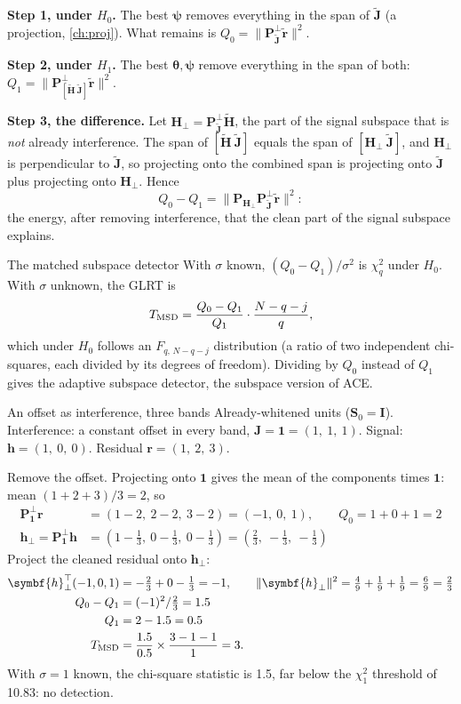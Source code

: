 \documentclass[11pt,a4paper,oneside,openany]{book}
\newcommand{\B}[1]{{\symbf{#1}}}
\newcommand{\B}[1]{{\bm{#1}}}
\newcommand{\T}{^{\top}}
\newcommand{\nrm}[1]{\lVert #1\rVert}
\newcommand{\vr}{\B{r}}
\newcommand{\vh}{\B{h}}
\newcommand{\vone}{\B{1}}
\newcommand{\vtheta}{\B{\theta}}
\newcommand{\vpsi}{\B{\psi}}
\newcommand{\mS}{\B{S}}
\newcommand{\mH}{\B{H}}
\newcommand{\mJ}{\B{J}}
\newcommand{\mP}{\B{P}}
\newcommand{\mI}{\B{I}}
\begin{document}
\textbf{Step 1, under $H_0$.} The best $\vpsi$ removes everything in the span of $\tilde{\mJ}$ (a projection, \cref{ch:proj}). What remains is
$Q_0=\nrm{\mP^\perp_{\tilde{\mJ}}\tilde{\vr}}^2$.

\textbf{Step 2, under $H_1$.} The best $\vtheta,\vpsi$ remove everything in the span of both: $Q_1=\nrm{\mP^\perp_{[\tilde{\mH}\ \tilde{\mJ}]}\tilde{\vr}}^2$.

\textbf{Step 3, the difference.} Let $\mH_\perp=\mP^\perp_{\tilde{\mJ}}\tilde{\mH}$, the part of the signal subspace that is \emph{not} already interference.
The span of $[\tilde{\mH}\ \tilde{\mJ}]$ equals the span of $[\mH_\perp\ \tilde{\mJ}]$, and $\mH_\perp$ is perpendicular to $\tilde{\mJ}$, so projecting onto the
combined span is projecting onto $\tilde{\mJ}$ plus projecting onto $\mH_\perp$. Hence
\[
  Q_0-Q_1=\nrm{\mP_{\mH_\perp}\mP^\perp_{\tilde{\mJ}}\tilde{\vr}}^2 :
\]
the energy, after removing interference, that the clean part of the signal subspace explains.

\begin{rulebox}[label=rule:msd]{The matched subspace detector}
With $\sigma$ known, $(Q_0-Q_1)/\sigma^2$ is $\chi^2_q$ under $H_0$. With $\sigma$ unknown, the GLRT is
\[
  T_{\rm MSD}=\frac{Q_0-Q_1}{Q_1}\cdot\frac{N-q-j}{q},
\]
which under $H_0$ follows an $F_{q,\,N-q-j}$ distribution (a ratio of two independent chi-squares, each divided by its degrees of freedom). Dividing by
$Q_0$ instead of $Q_1$ gives the adaptive subspace detector, the subspace version of ACE.
\end{rulebox}

\begin{worked}[label=we:msd]{An offset as interference, three bands}
Already-whitened units ($\mS_0=\mI$). Interference: a constant offset in every band, $\mJ=\vone=(1,\ 1,\ 1)$. Signal: $\vh=(1,\ 0,\ 0)$. Residual
$\vr=(1,\ 2,\ 3)$.

Remove the offset. Projecting onto $\vone$ gives the mean of the components times $\vone$: mean $(1+2+3)/3=2$, so
\begin{align*}
\mP^\perp_{\vone}\vr &= (1-2,\ 2-2,\ 3-2)=(-1,\ 0,\ 1),\qquad Q_0=1+0+1=2\\
\vh_\perp=\mP^\perp_{\vone}\vh &= (1-\tfrac13,\ 0-\tfrac13,\ 0-\tfrac13)=(\tfrac23,\ -\tfrac13,\ -\tfrac13)
\end{align*}
Project the cleaned residual onto $\vh_\perp$:
\begin{align*}
\vh_\perp\T(-1,0,1) &= -\tfrac23+0-\tfrac13=-1,\qquad \nrm{\vh_\perp}^2=\tfrac49+\tfrac19+\tfrac19=\tfrac69=\tfrac23\\
Q_0-Q_1 &= (-1)^2/\tfrac23=1.5\\
Q_1 &= 2-1.5=0.5\\
T_{\rm MSD} &= \frac{1.5}{0.5}\times\frac{3-1-1}{1}=3 .
\end{align*}
With $\sigma=1$ known, the chi-square statistic is 1.5, far below the $\chi^2_1$ threshold of 10.83: no detection.
\end{worked}
\end{document}
